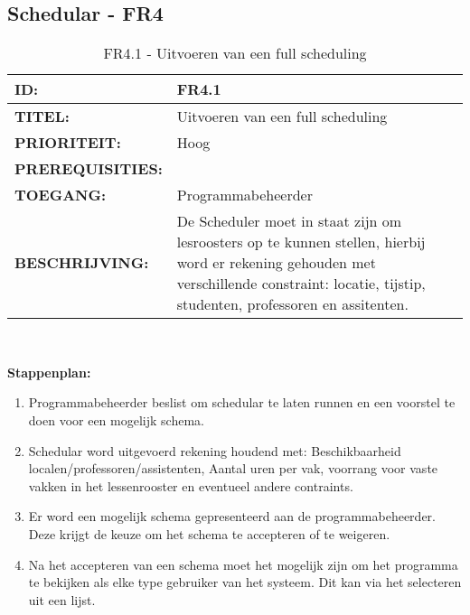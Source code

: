 \subsection{Schedular - FR4}

\noindent\begin{table}[H]
            \begin{tabular}{l | p{10cm}}
                \textbf{ID:} & FR4.1 \\ \hline
                \textbf{TITEL:} & Uitvoeren van een full scheduling\\ \hline
                \textbf{PRIORITEIT:} &  Hoog \\ \hline
                \textbf{PREREQUISITIES:} & \\ \hline
                \textbf{TOEGANG:} & Programmabeheerder \\ \hline
                \textbf{BESCHRIJVING:} & De Scheduler moet in staat zijn om lesroosters op te kunnen stellen, hierbij word er rekening gehouden met verschillende constraint: locatie, tijstip, studenten, professoren en assitenten. \\
            \end{tabular}\\
            \caption{FR4.1 - Uitvoeren van een full scheduling}
            \label{tab:FR4.1 - Uitvoeren van een full scheduling}
        \end{table}
      
\textbf{Stappenplan:}
	\begin{enumerate}
	\item Programmabeheerder beslist om schedular te laten runnen en een voorstel te doen voor een mogelijk schema.
	\item Schedular word uitgevoerd rekening houdend met: Beschikbaarheid localen/professoren/assistenten, Aantal uren per vak, voorrang voor vaste vakken in het lessenrooster en eventueel andere contraints.
	\item Er word een mogelijk schema gepresenteerd aan de programmabeheerder. Deze krijgt de keuze om het schema te accepteren of te weigeren.
	\item Na het accepteren van een schema moet het mogelijk zijn om het programma te bekijken als elke type gebruiker van het systeem. Dit kan via het selecteren uit een lijst.
	\end{enumerate}

